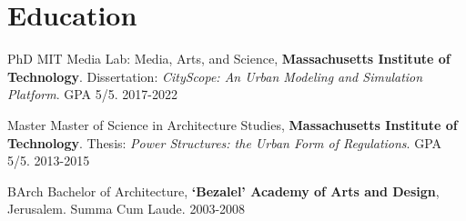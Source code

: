 \section*{Education}

\begin{tablist}

    \item[PhD] \tab MIT Media Lab: Media, Arts, and Science, \textbf{Massachusetts Institute of Technology}. Dissertation: \textit{CityScope: An Urban Modeling and Simulation Platform}. GPA 5/5. 2017-2022
    \item[Master] \tab Master of Science in Architecture Studies, \textbf{Massachusetts Institute of Technology}. Thesis: \textit{Power Structures: the Urban Form of Regulations}. GPA 5/5. 2013-2015
    \item[BArch]  \tab Bachelor of Architecture, \textbf{`Bezalel' Academy of Arts and Design}, Jerusalem. Summa Cum Laude. 2003-2008

\end{tablist}
